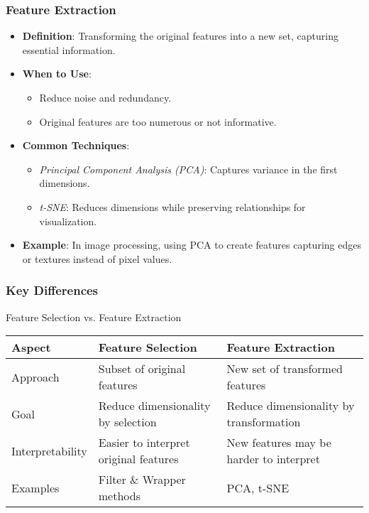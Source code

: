 \documentclass[aspectratio=169]{beamer}
\begin{document}
\begin{frame}[fragile]
    \frametitle{Feature Extraction}
    \begin{itemize}
        \item \textbf{Definition}: Transforming the original features into a new set, capturing essential information.
        \item \textbf{When to Use}:
        \begin{itemize}
            \item Reduce noise and redundancy.
            \item Original features are too numerous or not informative.
        \end{itemize}
        \item \textbf{Common Techniques}:
        \begin{itemize}
            \item \textit{Principal Component Analysis (PCA)}: Captures variance in the first dimensions.
            \item \textit{t-SNE}: Reduces dimensions while preserving relationships for visualization.
        \end{itemize}
        \item \textbf{Example}: In image processing, using PCA to create features capturing edges or textures instead of pixel values.
    \end{itemize}
\end{frame}

\begin{frame}[fragile]
    \frametitle{Key Differences}
    \begin{block}{Feature Selection vs. Feature Extraction}
        \begin{tabular}{|l|l|l|}
            \hline
            Aspect & Feature Selection & Feature Extraction \\
            \hline
            Approach & Subset of original features & New set of transformed features \\
            \hline
            Goal & Reduce dimensionality by selection & Reduce dimensionality by transformation \\
            \hline
            Interpretability & Easier to interpret original features & New features may be harder to interpret \\
            \hline
            Examples & Filter \& Wrapper methods & PCA, t-SNE \\
            \hline
        \end{tabular}
    \end{block}
\end{frame}
\end{document}
